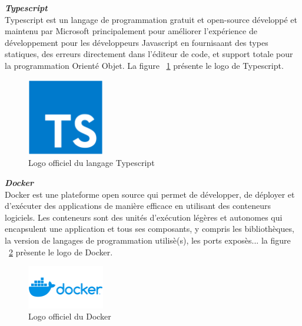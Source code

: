 \noindent
{\small\textbf{\textit{Typescript}}}\mbox{}\\
Typescript est un langage de programmation gratuit et open-source développé et maintenu par Microsoft principalement pour améliorer l'expérience de développement pour les développeurs Javascript en fournisaant des types statiques, des erreurs directement dans l'éditeur de code, et support totale pour la programmation Orienté Objet. La figure ~\ref{fig:typescript} présente le logo de Typescript.
\begin{figure}[H]
\centering
\includegraphics[width=0.3\textwidth]{logos/typescript.png}
\caption{Logo officiel du langage Typescript}
\label{fig:typescript}
\end{figure}

\noindent
{\small\textbf{\textit{Docker}}}\mbox{}\\
Docker est une plateforme open source qui permet de développer, de déployer et d'exécuter des applications de manière efficace en utilisant des conteneurs logiciels. Les conteneurs sont des unités d'exécution légères et autonomes qui encapsulent une application et tous ses composants, y compris les bibliothèques, la version de langages de programmation utilisè(s), les ports exposès... 
la figure ~\ref{fig:docker} prèsente le logo de Docker.
\begin{figure}[H]
\centering
\includegraphics[width=0.3\textwidth]{logos/docker.png}
\caption{Logo officiel du Docker}
\label{fig:docker}
\end{figure}

